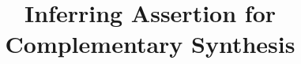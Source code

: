 \documentclass{acm_proc_article-sp}
\begin{document}
\title{Inferring Assertion for Complementary Synthesis}
%
%
%
%
%
\end{document}
